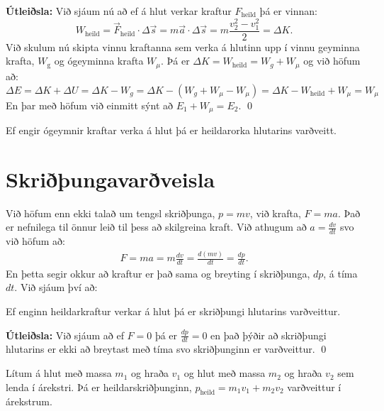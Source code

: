 \textbf{Útleiðsla:} Við sjáum nú að ef á hlut verkar kraftur $F_{\text{heild}}$ þá er vinnan:
\begin{equation*}
    W_{\text{heild}} = \vec{F}_{\text{heild}} \cdot \Delta \vec{s} = m \vec{a} \cdot \Delta \vec{s} = m \frac{v_2^2 - v_1^2}{2} = \Delta K.
\end{equation*}
Við skulum nú skipta vinnu kraftanna sem verka á hlutinn upp í vinnu geyminna krafta, $W_\text{g}$ og ógeyminna krafta $W_\mu$. Þá er $\Delta K = W_{\text{heild}} = W_g + W_\mu$ og við höfum að:
\begin{equation*}
    \Delta E = \Delta K + \Delta U = \Delta K - W_g = \Delta K - (W_g + W_\mu - W_\mu) =  \Delta K - W_{\text{heild}} + W_\mu = W_\mu
\end{equation*}
En þar með höfum við einmitt sýnt að $E_1 + W_\mu = E_2$. \qed

\begin{tcolorbox}
\begin{theorem}
Ef engir ógeymnir kraftar verka á hlut þá er heildarorka hlutarins varðveitt.
\end{theorem}
\end{tcolorbox}

\newpage

\section{Skriðþungavarðveisla}

Við höfum enn ekki talað um tengsl skriðþunga, $p = mv$, við krafta, $F = ma$. Það er nefnilega til önnur leið til þess að skilgreina kraft. Við athugum að $a = \frac{dv}{dt}$ svo við höfum að:
\begin{align*}
    F = ma = m\frac{dv}{dt} = \frac{d(mv)}{dt} = \frac{dp}{dt}.
\end{align*}
En þetta segir okkur að kraftur er það sama og breyting í skriðþunga, $dp$, á tíma $dt$. Við sjáum því að:

\begin{tcolorbox}
\begin{theorem}
Ef enginn heildarkraftur verkar á hlut þá er skriðþungi hlutarins varðveittur.
\end{theorem}
\end{tcolorbox}

\textbf{Útleiðsla:} Við sjáum að ef $F = 0$ þá er $\frac{dp}{dt} = 0$ en það þýðir að skriðþungi hlutarins er ekki að breytast með tíma svo skriðþunginn er varðveittur. \qed

\begin{tcolorbox}
\begin{theorem}
Lítum á hlut með massa $m_1$ og hraða $v_1$ og hlut með massa $m_2$ og hraða $v_2$ sem lenda í árekstri. Þá er heildarskriðþunginn, $p_{\text{heild}} = m_1 v_1 + m_2 v_2$ varðveittur í árekstrum.
\end{theorem}
\end{tcolorbox}

